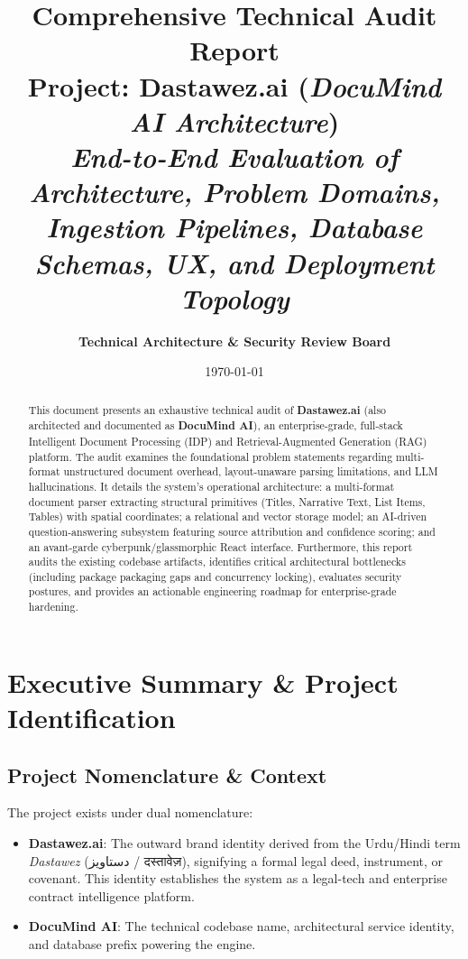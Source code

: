 \documentclass[11pt,a4paper]{article}
\title{
    \vspace{-1.5cm}
    \textbf{\Huge Comprehensive Technical Audit Report}\\
    \vspace{0.3cm}
    \Large Project: \textbf{Dastawez.ai} (\textit{DocuMind AI Architecture})\\
    \vspace{0.2cm}
    \normalsize \textit{End-to-End Evaluation of Architecture, Problem Domains, Ingestion Pipelines, Database Schemas, UX, and Deployment Topology}
}
\author{\textbf{Technical Architecture \& Security Review Board}}
\date{\today}
\begin{document}
\maketitle
\thispagestyle{empty}

\begin{abstract}
\noindent This document presents an exhaustive technical audit of \textbf{Dastawez.ai} (also architected and documented as \textbf{DocuMind AI}), an enterprise-grade, full-stack Intelligent Document Processing (IDP) and Retrieval-Augmented Generation (RAG) platform. The audit examines the foundational problem statements regarding multi-format unstructured document overhead, layout-unaware parsing limitations, and LLM hallucinations. It details the system's operational architecture: a multi-format document parser extracting structural primitives (Titles, Narrative Text, List Items, Tables) with spatial coordinates; a relational and vector storage model; an AI-driven question-answering subsystem featuring source attribution and confidence scoring; and an avant-garde cyberpunk/glassmorphic React interface. Furthermore, this report audits the existing codebase artifacts, identifies critical architectural bottlenecks (including package packaging gaps and concurrency locking), evaluates security postures, and provides an actionable engineering roadmap for enterprise-grade hardening.
\end{abstract}

\vspace{0.5cm}
\tableofcontents
\newpage

\section{Executive Summary \& Project Identification}

\subsection{Project Nomenclature \& Context}
The project exists under dual nomenclature:
\begin{itemize}[leftmargin=*]
    \item \textbf{Dastawez.ai}: The outward brand identity derived from the Urdu/Hindi term \textit{Dastawez} (\foreignlanguage{english}{دستاویز} / \foreignlanguage{english}{दस्तावेज़}), signifying a formal legal deed, instrument, or covenant. This identity establishes the system as a legal-tech and enterprise contract intelligence platform.
    \item \textbf{DocuMind AI}: The technical codebase name, architectural service identity, and database prefix powering the engine.
\end{itemize}
\end{document}
